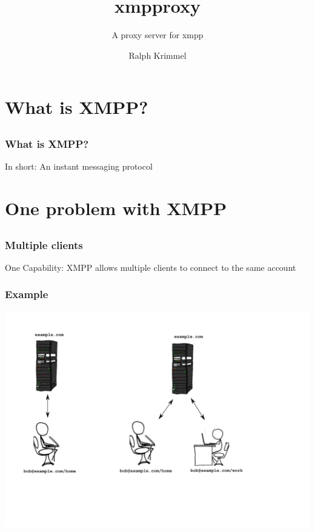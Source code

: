 \documentclass[notes=hide,yellow]{beamer}
\title{ xmpproxy}
\subtitle{A proxy server for xmpp }
\author{Ralph Krimmel}
\institute{University of Gothenburg}
\begin{document}
	\begin{frame}
		\titlepage 
	\end{frame}

	\section{What is XMPP?}
	\subsection*{}
	\begin{frame}
		\frametitle{What is XMPP?}
		\begin{block}{In short:}	
		An instant messaging protocol
		\end{block}
	\end{frame}

	\section{One problem with XMPP}
	\subsection*{}
	\begin{frame}
		\frametitle{Multiple clients}
		\begin{block}{One Capability:}
			XMPP allows multiple clients to connect to the same account 
		\end{block}
	\end{frame}

	\begin{frame}
		\frametitle{Example} 
		\includegraphics[scale=0.4]{../img/multiple-clients.pdf}
	\end{frame}
	
\end{document}
